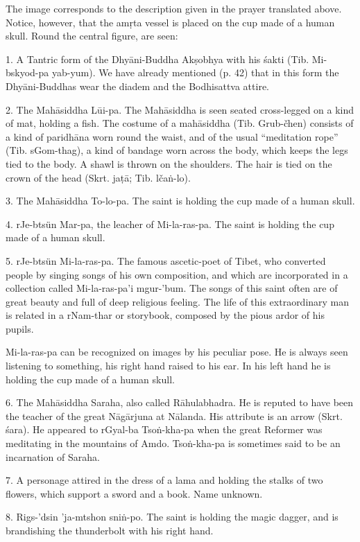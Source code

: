 \documentclass[a4paper, 12pt, oneside]{article}
\begin{document}
The image corresponds to the description given in the prayer translated above. Notice, however, that the am\d{r}ta vessel is placed on the cup made of a human skull. Round the central figure, are seen:

1. A Tantric form of the Dhy\={a}ni-Buddha Ak\d{s}obhya with his \'{s}akti (Tib. Mi-bskyod-pa yab-yum). We have already mentioned (p. 42) that in this form the Dhy\={a}ni-Buddhas wear the diadem and the Bodhisattva attire.

2. The Mah\={a}siddha L\={u}i-pa. The Mah\={a}siddha is seen seated cross-legged on a kind of mat, holding a fish. The costume of a mah\={a}siddha (Tib. Grub-čhen) consists of a kind of paridh\={a}na worn round the waist, and of the usual ``meditation rope'' (Tib. sGom-thag), a kind of bandage worn across the body, which keeps the legs tied to the body. A shawl is thrown on the shoulders. The hair is tied on the crown of the head (Skrt. ja\d{t}\={a}; Tib. lča\.{n}-lo).

3. The Mah\={a}siddha To-lo-pa. The saint is holding the cup made of a human skull.

4. rJe-btsün Mar-pa, the leacher of Mi-la-ras-pa. The saint is holding the cup made of a human skull.

5. rJe-btsün Mi-la-ras-pa. The famous ascetic-poet of Tibet, who converted people by singing songs of his own composition, and which are incorporated in a collection called Mi-la-ras-pa'i mgur-'bum. The songs of this saint often are of great beauty and full of deep religious feeling. The life of this extraordinary man is related in a rNam-thar or storybook, composed by the pious ardor of his pupils.

Mi-la-ras-pa can be recognized on images by his peculiar pose. He is always seen listening to something, his right hand raised to his ear. In his left hand he is holding the cup made of a human skull.

6. The Mah\={a}siddha Saraha, also called R\={a}hulabhadra. He is reputed to have been the teacher of the great N\={a}g\={a}rjuna at N\={a}landa. His attribute is an arrow (Skrt. \'{s}ara). He appeared to rGyal-ba Tso\.{n}-kha-pa when the great Reformer was meditating in the mountains of Amdo. Tso\.{n}-kha-pa is sometimes said to be an incarnation of Saraha.

7. A personage attired in the dress of a lama and holding the stalks of two flowers, which support a sword and a book. Name unknown.

8. Rigs-'dsin 'ja-mtshon sni\.{n}-po. The saint is holding the magic dagger, and is brandishing the thunderbolt with his right hand.
\end{document}
